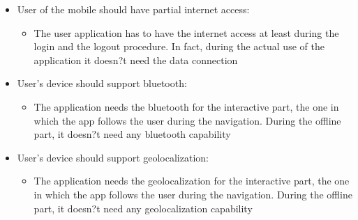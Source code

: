 \begin{itemize}
	\item User of the mobile should have partial internet access:
	\begin{itemize}
		\item The user application has to have the internet access at least during the login and the logout procedure. In fact, during the actual use of the application it doesn?t need the data connection
	\end{itemize}
	\item User's device should support bluetooth:
	\begin{itemize}
		\item The application needs the bluetooth for the interactive part, the one in which the app follows the user during the navigation. During the offline part, it doesn?t need any bluetooth capability
	\end{itemize}
	\item User's device should support geolocalization:
	\begin{itemize}
		\item The application needs the geolocalization for the interactive part, the one in which the app follows the user during the navigation. During the offline part, it doesn?t need any geolocalization capability
	\end{itemize}
\end{itemize}